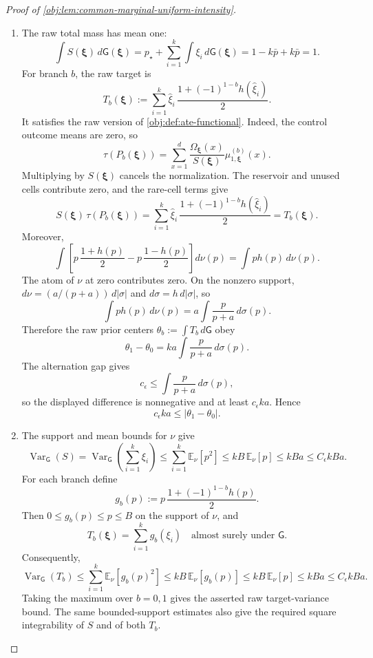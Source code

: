 \begin{proof}[Proof of \cref{obj:lem:common-marginal-uniform-intensity}]
\begin{enumerate}
\item The raw total mass has mean one:
\[
\int S(\boldsymbol\xi)\,d\mathsf G(\boldsymbol\xi)
=
p_\star+\sum_{i=1}^k\int \xi_i\,d\mathsf G(\boldsymbol\xi)
=
1-k\bar p+k\bar p
=
1 .
\]
For branch \(b\), the raw target is
\[
T_b(\boldsymbol\xi)
:=
\sum_{i=1}^k
\widehat\xi_i\,
\frac{1+(-1)^{1-b}h(\widehat\xi_i)}2 .
\]
It satisfies the raw version of \cref{obj:def:ate-functional}. Indeed, the control outcome means are zero, so
\[
\tau(P_b(\boldsymbol\xi))
=\sum_{x=1}^d
\frac{\Omega_{\boldsymbol\xi}(x)}{S(\boldsymbol\xi)}
\mu_{1,\boldsymbol\xi}^{(b)}(x).
\]
Multiplying by \(S(\boldsymbol\xi)\) cancels the normalization. The reservoir and unused cells contribute zero, and the rare-cell terms give
\[
S(\boldsymbol\xi)\,\tau(P_b(\boldsymbol\xi))
=
\sum_{i=1}^k
\widehat\xi_i\,
\frac{1+(-1)^{1-b}h(\widehat\xi_i)}2
=T_b(\boldsymbol\xi).
\]
Moreover,
\[
\int
\left[
p\,\frac{1+h(p)}2
-
p\,\frac{1-h(p)}2
\right]d\nu(p)
=
\int p h(p)\,d\nu(p).
\]
The atom of \(\nu\) at zero contributes zero. On the nonzero support, \(d\nu=(a/(p+a))\,d|\sigma|\) and \(d\sigma=h\,d|\sigma|\), so
\[
\int p h(p)\,d\nu(p)
=
a\int \frac{p}{p+a}\,d\sigma(p).
\]
Therefore the raw prior centers \(\theta_b:=\int T_b\,d\mathsf G\) obey
\[
\theta_1-\theta_0
=
k a\int \frac{p}{p+a}\,d\sigma(p).
\]
The alternation gap gives
\[
c_\epsilon\le \int \frac{p}{p+a}\,d\sigma(p),
\]
so the displayed difference is nonnegative and at least \(c_\epsilon k a\). Hence
\[
c_\epsilon k a\le |\theta_1-\theta_0|.
\]

\item The support and mean bounds for \(\nu\) give
\[
\operatorname{Var}_{\mathsf G}(S)
=
\operatorname{Var}_{\mathsf G}\left(\sum_{i=1}^k\xi_i\right)
\le
\sum_{i=1}^k\mathbb E_\nu[p^2]
\le
kB\,\mathbb E_\nu[p]
\le
kBa
\le C_\epsilon kBa .
\]
For each branch define
\[
g_b(p):=
p\,\frac{1+(-1)^{1-b}h(p)}2 .
\]
Then \(0\le g_b(p)\le p\le B\) on the support of \(\nu\), and
\[
T_b(\boldsymbol\xi)=\sum_{i=1}^k g_b(\xi_i)
\quad\text{almost surely under }\mathsf G .
\]
Consequently,
\[
\operatorname{Var}_{\mathsf G}(T_b)
\le
\sum_{i=1}^k\mathbb E_\nu[g_b(p)^2]
\le
kB\,\mathbb E_\nu[g_b(p)]
\le
kB\,\mathbb E_\nu[p]
\le
kBa
\le
C_\epsilon kBa .
\]
Taking the maximum over \(b=0,1\) gives the asserted raw target-variance bound. The same bounded-support estimates also give the required square integrability of \(S\) and of both \(T_b\). %


\end{enumerate}
\end{proof}
